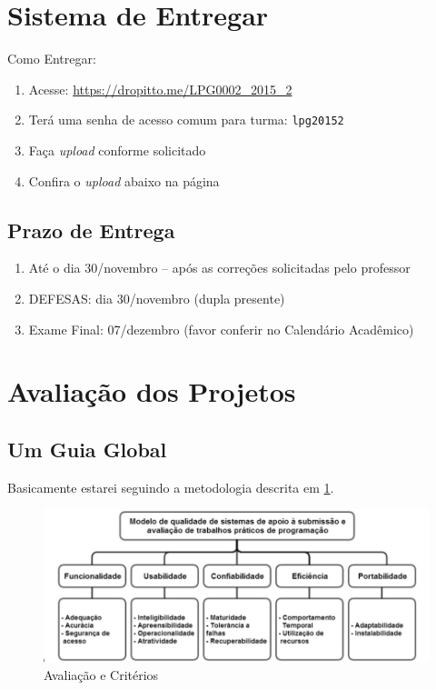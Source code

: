 \documentclass[12pt,a4paper]{article}
\begin{document}
\newpage
\section{Sistema de  Entregar}

Como Entregar:
\begin{enumerate}
  \item Acesse: \url{https://dropitto.me/LPG0002_2015_2}
  \item Terá uma senha de acesso comum para turma: \texttt{lpg20152}
    \item Faça \textit{upload} conforme solicitado
    \item Confira o \textit{upload} abaixo na página
    
\end{enumerate}



\subsection{Prazo de Entrega}


\begin{enumerate}
  \item Até o dia 30/novembro -- após as correções solicitadas pelo professor
  \item DEFESAS: dia 30/novembro (dupla presente)
    \item Exame Final: 07/dezembro (favor conferir no Calendário Acadêmico)
    
\end{enumerate}
 
\newpage
\section{Avaliação dos Projetos}

\subsection{Um Guia Global}
Basicamente estarei seguindo a metodologia descrita
em \ref{fig_aval_01}.

 \begin{figure}[!ht]
   \begin{center}
     \includegraphics[scale=0.55]{fig_avaliacao_pgms_01.jpg}
   
     \caption{Avaliação e Critérios}
       \label{fig_aval_01} %
   \end{center}
 \end{figure}
\end{document}
